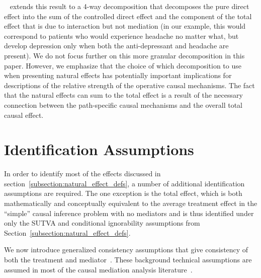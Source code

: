 
~\cite{vanderweele2014} extends this result to a 4-way decomposition that decomposes the pure direct effect into 
the sum of the controlled direct effect and the component of the total effect that is due to interaction but not 
mediation (in our example, this would correspond to patients who would experience headache no matter what, but 
develop depression only when both the anti-depressant and headache are present). We do not focus further on this 
more granular decomposition in this paper. However, we emphasize that the choice of which decomposition to use 
when presenting natural effects has potentially important implications for descriptions of the relative strength
of the operative causal mechanisms. The fact that the natural effects can sum to the total effect is a result of 
the necessary connection between the path-specific causal mechanisms and the overall total causal effect. 

\section{Identification Assumptions}\label{subsection:natural_effects_assm}

In order to identify most of the effects discussed in section~\ref{subsection:natural_effect_defs}, a number of 
additional identification assumptions are required. The one exception is the total effect, which is both mathematically 
and conceptually equivalent to the average treatment effect in the ``simple'' causal inference problem with no mediators 
and is thus identified under only the SUTVA and conditional ignorability assumptions 
from Section~\ref{subsection:natural_effect_defs}. 

We now introduce generalized consistency assumptions that give consistency of both the 
treatment and mediator~\citep{imaietal2013}. These background technical assumptions are assumed in most of the 
causal mediation analysis literature~\citep{pearl2001,imaietal2010a}.

